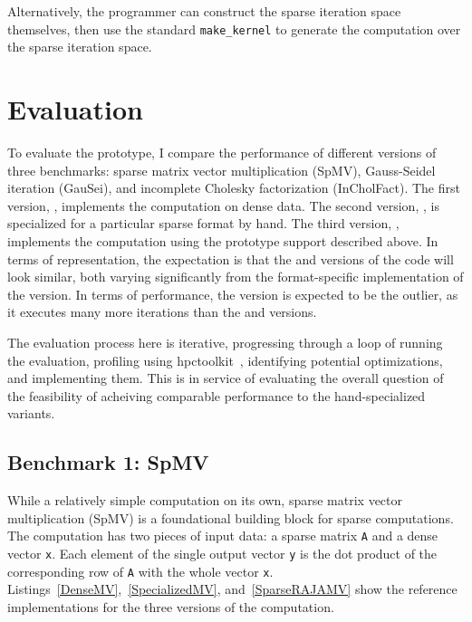 Alternatively, the programmer can construct the sparse iteration space themselves, then use the standard \verb.make_kernel. to generate the computation over the sparse iteration space.

\section{Evaluation}\label{sec:sparseEval}
To evaluate the prototype, I compare the performance of different versions of three benchmarks: sparse matrix vector multiplication (SpMV), Gauss-Seidel iteration (GauSei), and incomplete Cholesky factorization (InCholFact).
The first version, \dense, implements the computation on dense data. 
The second version, \specialized, is specialized for a particular sparse format by hand. 
The third version, \sparseraja, implements the computation using the prototype support described above.
In terms of representation, the expectation is that the \dense{} and \sparseraja{} versions of the code will look similar, both varying significantly from the format-specific implementation of the \specialized{} version.
In terms of performance, the \dense{} version is expected to be the outlier, as it executes many more iterations than the \sparseraja{} and \specialized{} versions.

The evaluation process here is iterative, progressing through a loop of running the evaluation, profiling using hpctoolkit~\cite{adhianto2010hpctoolkit}, identifying potential optimizations, and implementing them. 
This is in service of evaluating the overall question of the feasibility of acheiving comparable performance to the hand-specialized variants.





\subsection{Benchmark 1: SpMV}
While a relatively simple computation on its own, sparse matrix vector multiplication (SpMV) is a foundational building block for sparse computations.
The computation has two pieces of input data: a sparse matrix \verb.A. and a dense vector \verb.x.. 
Each element of the single output vector \verb.y. is the dot product of the corresponding row of \verb.A. with the whole vector \verb.x..
Listings~\ref{DenseMV},~\ref{SpecializedMV}, and~\ref{SparseRAJAMV} show the reference implementations for the three versions of the computation.


